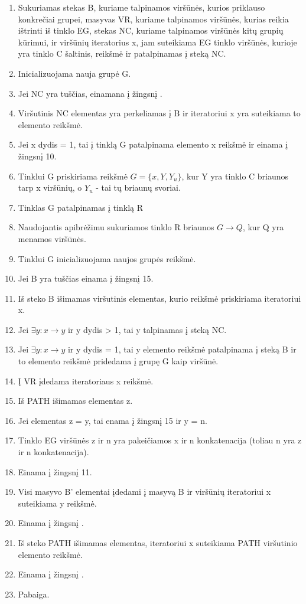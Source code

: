 \begin{enumerate}
	\item Sukuriamas stekas B, kuriame talpinamos viršūnės, kurios priklauso konkrečiai grupei, masyvas VR, kuriame talpinamos viršūnės, kurias reikia ištrinti iš tinklo EG, stekas NC, kuriame talpinamos viršūnės kitų grupių kūrimui, ir viršūnių iteratorius x, jam suteikiama EG tinklo viršūnės, kurioje yra tinklo C šaltinis, reikšmė ir patalpinamas į steką NC.
	\item Inicializuojama nauja grupė G.
	\item Jei NC yra tuščias, einamana į žingsnį .
	\item Viršutinis NC elementas yra perkeliamas į B ir iteratoriui x yra suteikiama to elemento reikšmė.
	\item Jei x dydis = 1, tai į tinklą G patalpinama elemento x reikšmė ir einama į žingsnį 10.
	\item Tinklui G priskiriama reikšmė $G=\{x, Y, Y_u\}$, kur Y yra tinklo C briaunos tarp x viršūnių, o $Y_u$ - tai tų briaunų svoriai. 
	\item Tinklas G patalpinamas į tinklą R
	\item Naudojantis apibrėžimu sukuriamos tinklo R briaunos $G \rightarrow Q$, kur Q yra menamos viršūnės.
	\item Tinklui G inicializuojama naujos grupės reikšmė.
	\item Jei B yra tuščias einama į žingsnį 15.
	\item Iš steko B išimamas viršutinis elementas, kurio reikšmė priskiriama iteratoriui x.
	\item Jei $\exists y : x \rightarrow y$ ir y dydis > 1, tai y talpinamas į steką NC.
	\item Jei $\exists y : x \rightarrow y$ ir y dydis = 1, tai y elemento reikšmė patalpinama į steką B ir to elemento reikšmė pridedama į grupę G kaip viršūnė.
	\item Į VR įdedama iteratoriaus x reikšmė.
	\item Iš PATH išimamas elementas z.
	\item Jei elementas z = y, tai enama į žingsnį 15 ir y = n.
	\item  Tinklo EG viršūnės z ir n yra pakeičiamos x ir n konkatenacija (toliau n yra z ir n konkatenacija).
	\item  Einama į žingsnį 11.
	\item  Visi masyvo B' elementai įdedami į masyvą B ir viršūnių iteratoriui x suteikiama y reikšmė.
	\item  Einama į žingsnį .
	\item  Iš steko PATH išimamas elementas, iteratoriui x suteikiama PATH viršutinio elemento reikšmė.
	\item  Einama į žingsnį .
	\item  Pabaiga.
\end{enumerate}

